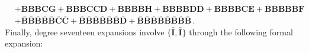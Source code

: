 \documentclass[10pt]{amsart}
\theoremstyle{definition}
\theoremstyle{corollary}
\theoremstyle{remark}
\theoremstyle{conclusion}
\begin{document}
\begin{align}
	&+\bar{\mathbf{B}}\bar{\mathbf{B}}\bar{\mathbf{B}}\bar{\mathbf{C}}\bar{\mathbf{G}}+\bar{\mathbf{B}}\bar{\mathbf{B}}\bar{\mathbf{B}}\bar{\mathbf{C}}\bar{\mathbf{C}}\bar{\mathbf{D}}+\bar{\mathbf{B}}\bar{\mathbf{B}}\bar{\mathbf{B}}\bar{\mathbf{B}}\bar{\mathbf{H}}+\bar{\mathbf{B}}\bar{\mathbf{B}}\bar{\mathbf{B}}\bar{\mathbf{B}}\bar{\mathbf{D}}\bar{\mathbf{D}}+\bar{\mathbf{B}}\bar{\mathbf{B}}\bar{\mathbf{B}}\bar{\mathbf{B}}\bar{\mathbf{C}}\bar{\mathbf{E}}+\bar{\mathbf{B}}\bar{\mathbf{B}}\bar{\mathbf{B}}\bar{\mathbf{B}}\bar{\mathbf{B}}\bar{\mathbf{F}}\nonumber \\
	&+\bar{\mathbf{B}}\bar{\mathbf{B}}\bar{\mathbf{B}}\bar{\mathbf{B}}\bar{\mathbf{B}}\bar{\mathbf{C}}\bar{\mathbf{C}}+\bar{\mathbf{B}}\bar{\mathbf{B}}\bar{\mathbf{B}}\bar{\mathbf{B}}\bar{\mathbf{B}}\bar{\mathbf{B}}\bar{\mathbf{D}}+\bar{\mathbf{B}}\bar{\mathbf{B}}\bar{\mathbf{B}}\bar{\mathbf{B}}\bar{\mathbf{B}}\bar{\mathbf{B}}\bar{\mathbf{B}}\bar{\mathbf{B}} \, .
\end{align}
Finally, degree seventeen expansions involve $\{\bar{\mathbf{I}},\bar{\mathbf{I}} \}$ through the following formal expansion:
\end{document}
